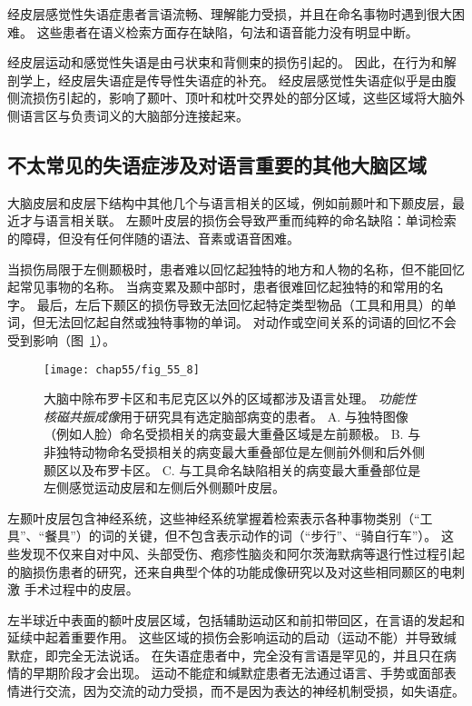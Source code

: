 经皮层感觉性失语症患者言语流畅、理解能力受损，并且在命名事物时遇到很大困难。
这些患者在语义检索方面存在缺陷，句法和语音能力没有明显中断。


经皮层运动和感觉性失语是由弓状束和背侧束的损伤引起的。
因此，在行为和解剖学上，经皮层失语症是传导性失语症的补充。
经皮层感觉性失语症似乎是由腹侧流损伤引起的，影响了颞叶、顶叶和枕叶交界处的部分区域，这些区域将大脑外侧语言区与负责词义的大脑部分连接起来。



\subsection{不太常见的失语症涉及对语言重要的其他大脑区域}

大脑皮层和皮层下结构中其他几个与语言相关的区域，例如前颞叶和下颞皮层，最近才与语言相关联。
左颞叶皮层的损伤会导致严重而纯粹的命名缺陷：单词检索的障碍，但没有任何伴随的语法、音素或语音困难。


当损伤局限于左侧颞极时，患者难以回忆起独特的地方和人物的名称，但不能回忆起常见事物的名称。
当病变累及颞中部时，患者很难回忆起独特的和常用的名字。
最后，左后下颞区的损伤导致无法回忆起特定类型物品（工具和用具）的单词，但无法回忆起自然或独特事物的单词。
对动作或空间关系的词语的回忆不会受到影响（图~\ref{fig:55_8}）。


\begin{figure}[htbp]
	\centering
	\texttt{[image: chap55/fig\_55\_8]}
	\caption{大脑中除布罗卡区和韦尼克区以外的区域都涉及语言处理。
		\textit{功能性核磁共振成像}用于研究具有选定脑部病变的患者。
		A. 与独特图像（例如人脸）命名受损相关的病变最大重叠区域是左前颞极。
		B. 与非独特动物命名受损相关的病变最大重叠部位是左侧前外侧和后外侧颞区以及布罗卡区。
		C. 与工具命名缺陷相关的病变最大重叠部位是左侧感觉运动皮层和左侧后外侧颞叶皮层。}
	\label{fig:55_8}
\end{figure}


左颞叶皮层包含神经系统，这些神经系统掌握着检索表示各种事物类别（“工具”、“餐具”）的词的关键，但不包含表示动作的词（“步行”、“骑自行车”）。
这些发现不仅来自对中风、头部受伤、疱疹性脑炎和阿尔茨海默病等退行性过程引起的脑损伤患者的研究，还来自典型个体的功能成像研究以及对这些相同颞区的电刺激 手术过程中的皮层。


左半球近中表面的额叶皮层区域，包括辅助运动区和前扣带回区，在言语的发起和延续中起着重要作用。
这些区域的损伤会影响运动的启动（运动不能）并导致缄默症，即完全无法说话。
在失语症患者中，完全没有言语是罕见的，并且只在病情的早期阶段才会出现。
运动不能症和缄默症患者无法通过语言、手势或面部表情进行交流，因为交流的动力受损，而不是因为表达的神经机制受损，如失语症。


